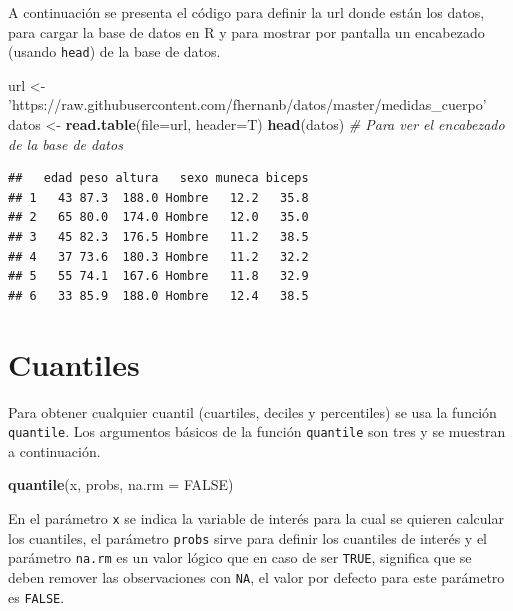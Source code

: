 \documentclass[10pt,]{krantz}
\makeatletter
\newenvironment{Shaded}{\begin{snugshade}}{\end{snugshade}}
\newcommand{\KeywordTok}[1]{\textcolor[rgb]{0.13,0.29,0.53}{\textbf{{#1}}}}
\newcommand{\DataTypeTok}[1]{\textcolor[rgb]{0.13,0.29,0.53}{{#1}}}
\newcommand{\StringTok}[1]{\textcolor[rgb]{0.31,0.60,0.02}{{#1}}}
\newcommand{\CommentTok}[1]{\textcolor[rgb]{0.56,0.35,0.01}{\textit{{#1}}}}
\newcommand{\OtherTok}[1]{\textcolor[rgb]{0.56,0.35,0.01}{{#1}}}
\newcommand{\NormalTok}[1]{{#1}}
\newenvironment{kframe}{%
\medskip{}
\setlength{\fboxsep}{.8em}
 \def\at@end@of@kframe{}%
 \ifinner\ifhmode%
  \def\at@end@of@kframe{\end{minipage}}%
  \begin{minipage}{\columnwidth}%
 \fi\fi%
 \def\FrameCommand##1{\hskip\@totalleftmargin \hskip-\fboxsep
 \colorbox{shadecolor}{##1}\hskip-\fboxsep
     \hskip-\linewidth \hskip-\@totalleftmargin \hskip\columnwidth}%
 \MakeFramed {\advance\hsize-\width
   \@totalleftmargin\z@ \linewidth\hsize
   \@setminipage}}%
 {\par\unskip\endMakeFramed%
 \at@end@of@kframe}
\renewenvironment{Shaded}{\begin{kframe}}{\end{kframe}}
\makeatother
\begin{document}
A continuación se presenta el código para definir la url donde están los
datos, para cargar la base de datos en R y para mostrar por pantalla un
encabezado (usando \texttt{head}) de la base de datos.

\begin{Shaded}
\begin{Highlighting}[]
\NormalTok{url <-}\StringTok{ 'https://raw.githubusercontent.com/fhernanb/datos/master/medidas_cuerpo'}
\NormalTok{datos <-}\StringTok{ }\KeywordTok{read.table}\NormalTok{(}\DataTypeTok{file=}\NormalTok{url, }\DataTypeTok{header=}\NormalTok{T)}
\KeywordTok{head}\NormalTok{(datos)  }\CommentTok{# Para ver el encabezado de la base de datos}
\end{Highlighting}
\end{Shaded}

\begin{verbatim}
##   edad peso altura   sexo muneca biceps
## 1   43 87.3  188.0 Hombre   12.2   35.8
## 2   65 80.0  174.0 Hombre   12.0   35.0
## 3   45 82.3  176.5 Hombre   11.2   38.5
## 4   37 73.6  180.3 Hombre   11.2   32.2
## 5   55 74.1  167.6 Hombre   11.8   32.9
## 6   33 85.9  188.0 Hombre   12.4   38.5
\end{verbatim}

\section{\texorpdfstring{Cuantiles  
 
}{Cuantiles     }}\label{cuantiles}

Para obtener cualquier cuantil (cuartiles, deciles y percentiles) se usa
la función \texttt{quantile}. Los argumentos básicos de la función
\texttt{quantile} son tres y se muestran a continuación.

\begin{Shaded}
\begin{Highlighting}[]
\KeywordTok{quantile}\NormalTok{(x, probs, }\DataTypeTok{na.rm =} \OtherTok{FALSE}\NormalTok{)}
\end{Highlighting}
\end{Shaded}

En el parámetro \texttt{x} se indica la variable de interés para la cual
se quieren calcular los cuantiles, el parámetro \texttt{probs} sirve
para definir los cuantiles de interés y el parámetro \texttt{na.rm} es
un valor lógico que en caso de ser \texttt{TRUE}, significa que se deben
remover las observaciones con \texttt{NA}, el valor por defecto para
este parámetro es \texttt{FALSE}.
\end{document}
